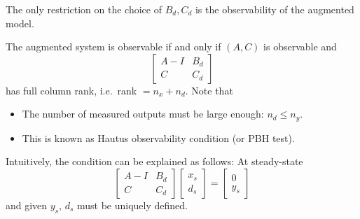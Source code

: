 \newpar{}

The only restriction on the choice of $B_d, C_d$ is the observability of the augmented model.

\newpar{}
The augmented system is observable if and only if $(A, C)$ is observable and
\begin{equation*}
    \begin{bmatrix}
        A - I & B_d \\
        C     & C_d
    \end{bmatrix}
\end{equation*}
has full column rank, i.e.\ rank $= n_x + n_d$.
\newpar{}
Note that
\begin{itemize}
    \item The number of measured outputs must be large enough: $n_d \leq n_y$.
    \item This is known as Hautus observability condition (or PBH test).
\end{itemize}
\newpar{}
Intuitively, the condition can be explained as follows: At steady-state
\begin{equation*}
    \begin{bmatrix}
        A - I & B_d \\
        C     & C_d
    \end{bmatrix}
    \begin{bmatrix}
        x_s \\
        d_s
    \end{bmatrix}
    =
    \begin{bmatrix}
        0 \\
        y_s
    \end{bmatrix}
\end{equation*}
and given $y_s$, $d_s$ must be uniquely defined.

